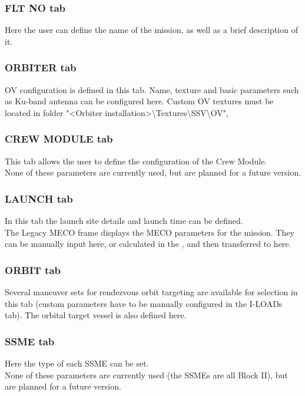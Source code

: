 \documentclass[Space_Shuttle_Vessel_Manual.tex]{subfiles}
\begin{document}
\begin{multicols*}{2}
\subsubsection{FLT NO tab}
Here the user can define the name of the mission, as well as a brief description of it.


\subsubsection{ORBITER tab}
OV configuration is defined in this tab. Name, texture and basic parameters such as Ku-band antenna can be configured here.
Custom OV textures must be located in folder "<Orbiter installation>\textbackslash Textures\textbackslash SSV\textbackslash OV",

\subsubsection{CREW MODULE tab}
This tab allows the user to define the configuration of the Crew Module.\\
None of these parameters are currently used, but are planned for a future version.


\subsubsection{LAUNCH tab}
In this tab the launch site details and launch time can be defined.\\
The Legacy MECO frame displays the MECO parameters for the mission. They can be manually input here, or calculated in the , and then transferred to here.


\subsubsection{ORBIT tab}
Several maneuver sets for rendezvous orbit targeting are available for selection in this tab (custom parameters have to be manually configured in the I-LOADs tab). The orbital target vessel is also defined here.


\subsubsection{SSME tab}
Here the type of each SSME can be set.\\
None of these parameters are currently used (the SSMEs are all Block II), but are planned for a future version.



\end{multicols*}
\end{document}
